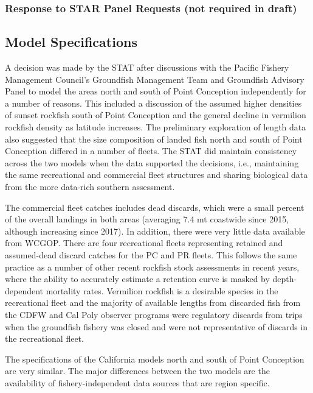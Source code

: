 \documentclass[
  english,
  a4paper,
]{article}
\begin{document}
\hypertarget{response-to-star-panel-requests-not-required-in-draft}{%
\subsubsection{Response to STAR Panel Requests (not required in draft)}\label{response-to-star-panel-requests-not-required-in-draft}}

\hypertarget{model-specifications}{%
\subsection{Model Specifications}\label{model-specifications}}

A decision was made by the STAT after discussions with the Pacific Fishery Management Council's Groundfish Management Team and Groundfish Advisory Panel to model the areas north and south of Point Conception independently for a number of reasons. This included a discussion of the assumed higher densities of sunset rockfish south of Point Conception and the general decline in vermilion rockfish density as latitude increases. The preliminary exploration of length data also suggested that the size composition of landed fish north and south of Point Conception differed in a number of fleets. The STAT did maintain consistency across the two models when the data supported the decisions, i.e., maintaining the same recreational and commercial fleet structures and sharing biological data from the more data-rich southern assessment.

The commercial fleet catches includes dead discards, which were a small percent of the overall landings in both areas (averaging 7.4 mt coastwide since 2015, although increasing since 2017). In addition, there were very little data available from WCGOP. There are four recreational fleets representing retained and assumed-dead discard catches for the PC and PR fleets. This follows the same practice as a number of other recent rockfish stock assessments in recent years, where the ability to accurately estimate a retention curve is masked by depth-dependent mortality rates. Vermilion rockfish is a desirable species in the recreational fleet and the majority of available lengths from discarded fish from the CDFW and Cal Poly observer programs were regulatory discards from trips when the groundfish fishery was closed and were not representative of discards in the recreational fleet.

The specifications of the California models north and south of Point Conception are very similar. The major differences between the two models are the availability of fishery-independent data sources that are region specific.
\end{document}
